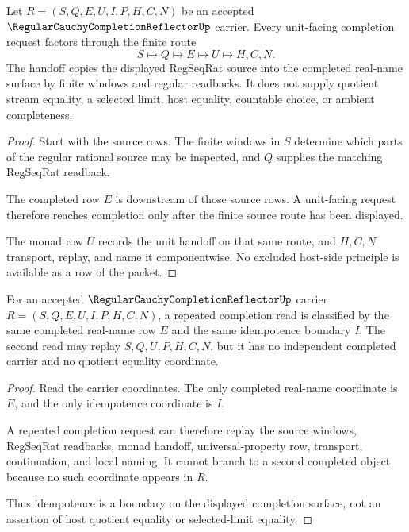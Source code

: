 \begin{theorem}
\label{thm:regular-cauchy-completion-reflector-unit-handoff}
Let $R=(S,Q,E,U,I,P,H,C,N)$ be an accepted $\RegularCauchyCompletionReflectorUp$ carrier. Every unit-facing completion request factors through the finite route
$$
S\longmapsto Q\longmapsto E\longmapsto U\longmapsto H,C,N .
$$
The handoff copies the displayed RegSeqRat source into the completed real-name surface by finite windows and regular readbacks. It does not supply quotient stream equality, a selected limit, host equality, countable choice, or ambient completeness.
\end{theorem}
\begin{proof}
Start with the source rows. The finite windows in $S$ determine which parts of the regular rational source may be inspected, and $Q$ supplies the matching RegSeqRat readback.

The completed row $E$ is downstream of those source rows. A unit-facing request therefore reaches completion only after the finite source route has been displayed.

The monad row $U$ records the unit handoff on that same route, and $H,C,N$ transport, replay, and name it componentwise. No excluded host-side principle is available as a row of the packet.
\end{proof}

\begin{theorem}
\label{thm:regular-cauchy-completion-reflector-idempotence-boundary}
For an accepted $\RegularCauchyCompletionReflectorUp$ carrier $R=(S,Q,E,U,I,P,H,C,N)$, a repeated completion read is classified by the same completed real-name row $E$ and the same idempotence boundary $I$. The second read may replay $S,Q,U,P,H,C,N$, but it has no independent completed carrier and no quotient equality coordinate.
\end{theorem}
\begin{proof}
Read the carrier coordinates. The only completed real-name coordinate is $E$, and the only idempotence coordinate is $I$.

A repeated completion request can therefore replay the source windows, RegSeqRat readbacks, monad handoff, universal-property row, transport, continuation, and local naming. It cannot branch to a second completed object because no such coordinate appears in $R$.

Thus idempotence is a boundary on the displayed completion surface, not an assertion of host quotient equality or selected-limit equality.
\end{proof}

